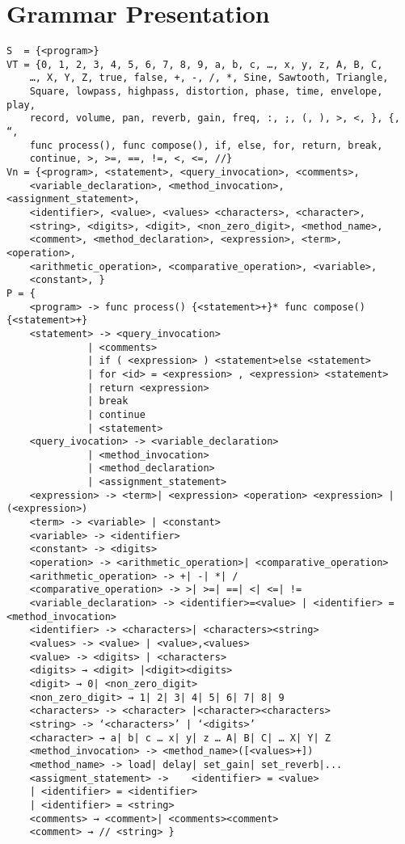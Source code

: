\chapter{Grammar Presentation}

\begin{verbatim}
S  = {<program>}
VT = {0, 1, 2, 3, 4, 5, 6, 7, 8, 9, a, b, c, …, x, y, z, A, B, C, 
    …, X, Y, Z, true, false, +, -, /, *, Sine, Sawtooth, Triangle, 
    Square, lowpass, highpass, distortion, phase, time, envelope, play, 
    record, volume, pan, reverb, gain, freq, :, ;, (, ), >, <, }, {, “, 
    func process(), func compose(), if, else, for, return, break, 
    continue, >, >=, ==, !=, <, <=, //}
Vn = {<program>, <statement>, <query_invocation>, <comments>, 
    <variable_declaration>, <method_invocation>, <assignment_statement>, 
    <identifier>, <value>, <values> <characters>, <character>, 
    <string>, <digits>, <digit>, <non_zero_digit>, <method_name>, 
    <comment>, <method_declaration>, <expression>, <term>, <operation>, 
    <arithmetic_operation>, <comparative_operation>, <variable>, 
    <constant>, }
P = {
    <program> -> func process() {<statement>+}* func compose() {<statement>+}
    <statement> -> <query_invocation>
              | <comments>
              | if ( <expression> ) <statement>else <statement>
              | for <id> = <expression> , <expression> <statement>
              | return <expression> 
              | break  
              | continue 
              | <statement>
    <query_ivocation> -> <variable_declaration> 
              | <method_invocation> 
              | <method_declaration>
              | <assignment_statement>
    <expression> -> <term>| <expression> <operation> <expression> | (<expression>)
    <term> -> <variable> | <constant>
    <variable> -> <identifier>
    <constant> -> <digits>
    <operation> -> <arithmetic_operation>| <comparative_operation>
    <arithmetic_operation> -> +| -| *| /
    <comparative_operation> -> >| >=| ==| <| <=| !=
    <variable_declaration> -> <identifier>=<value> | <identifier> = <method_invocation>
    <identifier> -> <characters>| <characters><string>
    <values> -> <value> | <value>,<values>
    <value> -> <digits> | <characters>
    <digits> → <digit> |<digit><digits>
    <digit> → 0| <non_zero_digit>
    <non_zero_digit> → 1| 2| 3| 4| 5| 6| 7| 8| 9
    <characters> -> <character> |<character><characters>
    <string> -> ‘<characters>’ | ‘<digits>’
    <character> → a| b| c … x| y| z … A| B| C| … X| Y| Z
    <method_invocation> -> <method_name>([<values>+])
    <method_name> -> load| delay| set_gain| set_reverb|...
    <assigment_statement> -> 	<identifier> = <value> 
    | <identifier> = <identifier> 
    | <identifier> = <string>
    <comments> → <comment>| <comments><comment>
    <comment> → // <string> }
\end{verbatim}